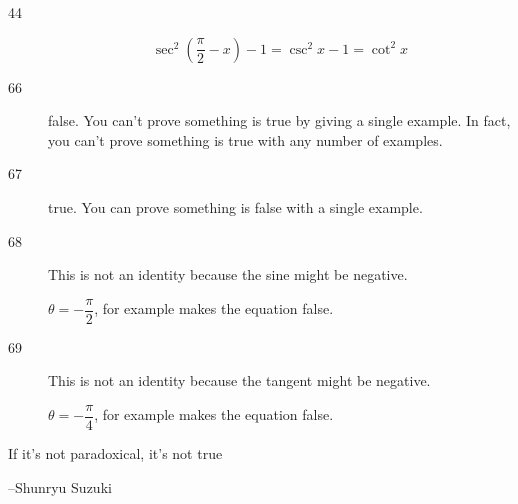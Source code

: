 \documentclass[fleqn,addpoints]{exam}
\begin{document}
\begin{description}
\item[44]
\[
  \sec^2 \left( \frac{\pi}{2} - x \right) - 1 = \csc^2 x - 1 = \cot^2 x
\]

\item[66]
false.  You can't prove something is true by giving a single example.  In fact, you can't prove something is true with
any number of examples.

\item[67]
true.  You can prove something is false with a single example.

\item[68]
This is not an identity because the sine might be negative.  

$\theta = -\dfrac{\pi}{2}$, for example makes the equation false.

\item[69]
This is not an identity because the tangent might be negative.  

$\theta = -\dfrac{\pi}{4}$, for example makes the equation false.

\end{description}


\else

\vspace{4.5 in}

\begin{em}
  If it's not paradoxical, it's not true
\end{em}

\vspace{.2 cm}
\hspace{1.5 cm} --Shunryu Suzuki

\fi
\end{document}
